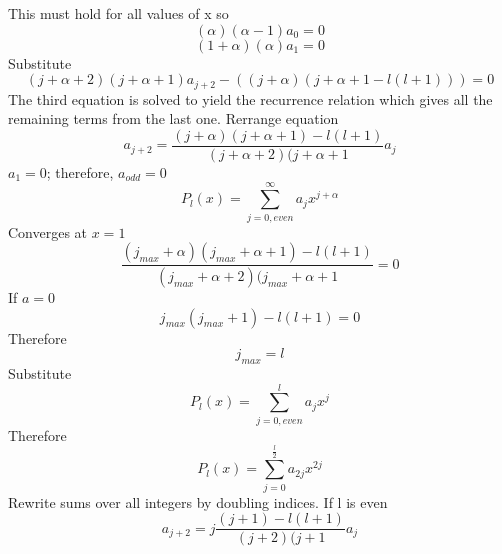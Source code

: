 \documentclass[12pt]{article}
\begin{document}
    This must hold for all values of x so
    \begin{equation} \label{eq: 2.7}
        (\alpha) (\alpha - 1) a_0 = 0
    \end{equation}            
    \begin{equation} \label{eq: 2.8}
        (1 + \alpha) (\alpha) a_1 = 0
    \end{equation}            
    Substitute 
    \begin{equation} \label{eq: 2.9}
        (j + \alpha + 2) (j + \alpha + 1) a_{j + 2} - ((j + \alpha) (j + \alpha + 1 - l(l+1))) = 0
    \end{equation}  
    The third equation is solved to yield the recurrence relation which gives all the remaining terms from the last one. Rerrange equation
    \begin{equation} \label{eq: 2.10}
        a_{j+2} = \frac{(j+\alpha)(j+\alpha+1) - l(l+1)}{(j + \alpha + 2) (j + \alpha + 1} a_j
    \end{equation}      
    $a_1 = 0$; therefore, $a_{odd} = 0$
    \begin{equation} \label{eq: 2.11}
        P_l(x) = \sum_{j=0,even}^{\infty} a_j x^{j+\alpha}
    \end{equation}  
    Converges at $x=1$
    \begin{equation} \label{eq: 2.12}
        \frac{(j_{max}+\alpha)(j_{max}+\alpha+1) - l(l+1)}{(j_{max} + \alpha + 2) (j_{max} + \alpha + 1} =0
    \end{equation}      
    If $a=0$
    \begin{equation} \label{eq: 2.13}
        j_{max} (j_{max} + 1) - l(l+1) =0
    \end{equation}      
    Therefore 
    \begin{equation} \label{eq: 2.14}
        j_{max}=l
    \end{equation}          
    Substitute 
    \begin{equation} \label{eq: 2.15}
        P_l(x) = \sum_{j=0,even}^{l} a_j x^{j}
    \end{equation}      
    Therefore 
    \begin{equation} \label{eq: 2.16}
        P_l(x) = \sum_{j=0}^{\frac{l}{2}} a_{2j }x^{2j}
    \end{equation}    
    Rewrite sums over all integers by doubling indices. If l is even
    \begin{equation} \label{eq: 2.17}
        a_{j+2} = j \frac{(j+1) - l(l+1)}{(j + 2) (j + 1} a_j
    \end{equation} 
\end{document}
